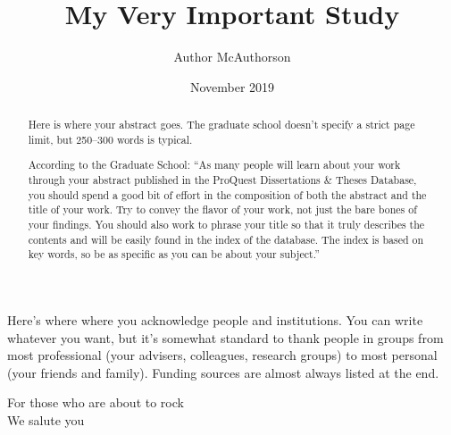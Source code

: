 \documentclass[showabstract,showacknowledgments,showdedication]{iuphd}
\title{My Very Important Study}
\author{Author McAuthorson}
\date{November 2019} %
\begin{document}
\maketitle
\acceptancepage




\begin{acknowledgments}


Here's where where you acknowledge people and institutions.
You can write whatever you want, but it's somewhat standard to thank people in groups from most professional (your advisers, colleagues, research groups) to most personal (your friends and family). 
Funding sources are almost always listed at the end.

 

\end{acknowledgments}


\begin{dedication}
For those who are about to rock\\
We salute you
\end{dedication}




\begin{abstract}
Here is where your abstract goes.
The graduate school doesn't specify a strict page limit, but 250--300 words is typical.

According to the Graduate School: ``As many people will learn about your work through your abstract published in the ProQuest Dissertations \& Theses Database, you should spend a good bit of effort in the composition of both the abstract and the title of your work. Try to convey the flavor of your work, not just the bare bones of your findings. You should also work to phrase your title so that it truly describes the contents and will be easily found in the index of the database. The index is based on key words, so be as specific as you can be about your subject.''

\newpage

\end{abstract}
\end{document}
